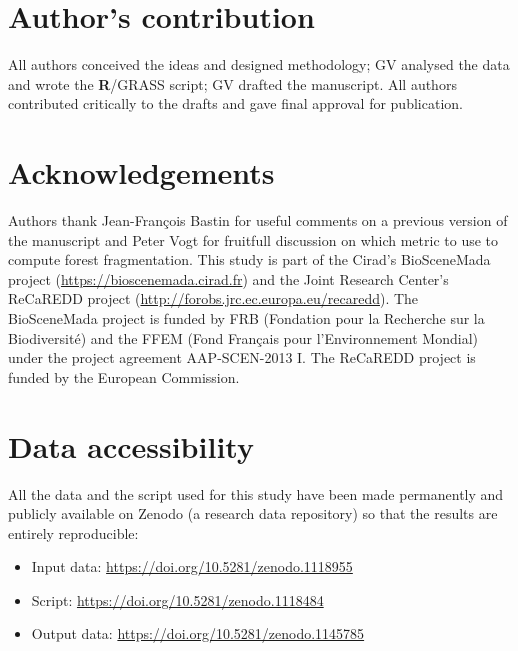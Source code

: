 \documentclass[a4paper, 12pt, leqno]{article} %
\newcommand{\R}{\textnormal{\sffamily\bfseries R}}
\begin{document}
\newpage

\section{Author's contribution}
\label{authors-contribution}

All authors conceived the ideas and designed methodology; GV analysed
the data and wrote the {\R}/GRASS script; GV drafted the manuscript. All
authors contributed critically to the drafts and gave final approval for
publication.

\section{Acknowledgements}
\label{acknowledgements}

Authors thank Jean-François Bastin for useful comments on a previous
version of the manuscript and Peter Vogt for fruitfull discussion on
which metric to use to compute forest fragmentation. This study is
part of the Cirad's BioSceneMada project
(\url{https://bioscenemada.cirad.fr}) and the Joint Research Center's
ReCaREDD project (\url{http://forobs.jrc.ec.europa.eu/recaredd}). The
BioSceneMada project is funded by FRB (Fondation pour la Recherche sur
la Biodiversité) and the FFEM (Fond Français pour l'Environnement
Mondial) under the project agreement AAP-SCEN-2013 I. The ReCaREDD
project is funded by the European Commission.

\section{Data accessibility}
\label{data-accessibility}

All the data and the script used for this study have been made permanently and publicly available
on Zenodo (a research data repository) so that the results are entirely reproducible:
\begin{itemize}
\item Input data: \url{https://doi.org/10.5281/zenodo.1118955}
\item Script: \url{https://doi.org/10.5281/zenodo.1118484}
\item Output data: \url{https://doi.org/10.5281/zenodo.1145785}
\end{itemize}

\newpage
\singlespacing

\end{document}
